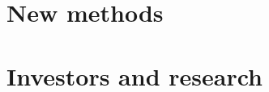 \documentclass[12pt]{Beautybook-EN}
\begin{document}
\part{New methods}

\part{Investors and research}



\backmatter
\renewcommand{\thechapter}{}   %



\clearpage
\printindex

\thispagestyle{empty}

\end{document}
